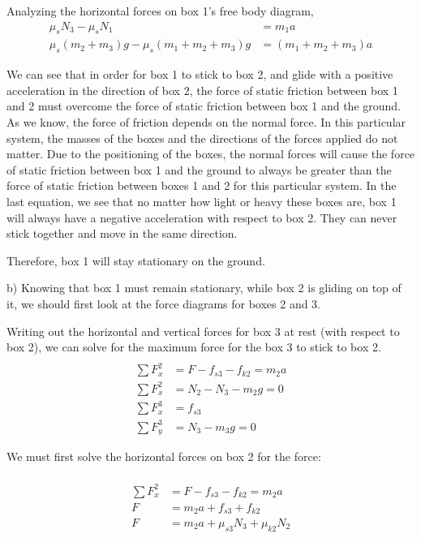 Analyzing the horizontal forces on box 1's free body diagram,
\begin{align*}
\mu _sN_{3}-\mu_sN_1&=m_1a
\\ \mu _s(m_2+m_3)g-\mu _s(m_1+m_2+m_3)g&=(m_1+m_2+m_3)a
\end{align*}

We can see that in order for box 1 to stick to box 2, and glide with a positive acceleration in the direction of box 2, the force of static friction between box 1 and 2 must overcome the force of static friction between box 1 and the ground. As we know, the force of friction depends on the normal force. In this particular system, the masses of the boxes and the directions of the forces applied do not matter. Due to the positioning of the boxes, the normal forces will cause the force of static friction between box 1 and the ground to always be greater than the force of static friction between boxes 1 and 2 for this particular system. In the last equation, we see that no matter how light or heavy these boxes are, box 1 will always have a negative acceleration with respect to box 2. They can never stick together and move in the same direction.

Therefore, box 1 will stay stationary on the ground.

b) Knowing that box 1 must remain stationary, while box 2 is gliding on top of it, we should first look at the force diagrams for boxes 2 and 3.


Writing out the horizontal and vertical forces for box 3 at rest (with respect to box 2), we can solve for the maximum force for the box 3 to stick to box 2.
\begin{align*}
\\ \sum F_x^{2}&=F-f_{s3}-f_{k2}=m_2a
\\ \sum F_x^{2}&=N_2-N_3-m_2g=0
\\ \sum F_x^{3}&=f_{s3}
\\ \sum F_y^{3}&=N_3-m_3g=0
\end{align*}

We must first solve the horizontal forces on box 2 for the force:

\begin{align*}
\\ \sum F_x^{2}&=F-f_{s3}-f_{k2}=m_2a
\\ F&=m_2a+f_{s3}+f_{k2}
\\ F&=m_2a+\mu_{s3}N_3+\mu_{k2}N_2
\end{align*}

